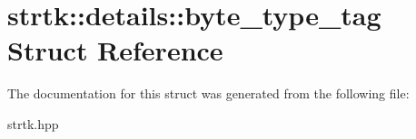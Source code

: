 \hypertarget{structstrtk_1_1details_1_1byte__type__tag}{\section{strtk\-:\-:details\-:\-:byte\-\_\-type\-\_\-tag Struct Reference}
\label{structstrtk_1_1details_1_1byte__type__tag}
}


The documentation for this struct was generated from the following file\-:\begin{DoxyCompactItemize}
\item 
strtk.\-hpp\end{DoxyCompactItemize}
